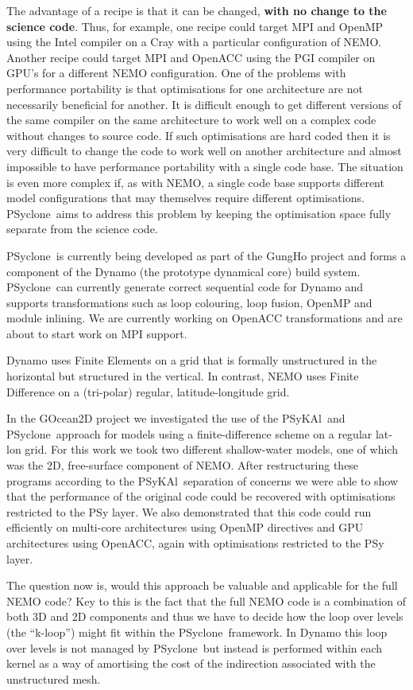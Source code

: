 \documentclass{article}
\newcommand{\psykal}{{PS}y{KA}l}
\newcommand{\psyclone}{{PS}yclone}
\begin{document}
The advantage of a recipe is that it can be changed, {\bf with no
  change to the science code}. Thus, for example, one recipe could
target MPI and OpenMP using the Intel compiler on a Cray with a
particular configuration of NEMO. Another recipe could target MPI and
OpenACC using the PGI compiler on GPU's for a different NEMO
configuration. One of the problems with performance portability is
that optimisations for one architecture are not necessarily beneficial
for another. It is difficult enough to get different versions of the
same compiler on the same architecture to work well on a complex code
without changes to source code. If such optimisations are hard coded
then it is very difficult to change the code to work well on another
architecture and almost impossible to have performance portability
with a single code base. The situation is even more complex if, as
with NEMO, a single code base supports different model configurations
that may themselves require different optimisations. \psyclone\ aims
to address this problem by keeping the optimisation space fully
separate from the science code.

\psyclone\ is currently being developed as part of the GungHo project
and forms a component of the Dynamo (the prototype dynamical core)
build system. \psyclone\ can currently generate correct sequential code
for Dynamo and supports transformations such as loop colouring, loop
fusion, OpenMP and module inlining. We are currently working
on OpenACC transformations and are about to start work on MPI support.

Dynamo uses Finite Elements on a grid that is formally
unstructured in the horizontal but structured in the vertical.  In
contrast, NEMO uses Finite Difference on a (tri-polar) regular,
latitude-longitude grid.

In the GOcean2D project we investigated the use of the \psykal\ and
\psyclone\ approach for models using a finite-difference scheme on a
regular lat-lon grid. For this work we took two different
shallow-water models, one of which was the 2D, free-surface component
of NEMO. After restructuring these programs according to the
\psykal\ separation of concerns we were able to show that the
performance of the original code could be recovered with optimisations
restricted to the PSy layer. We also demonstrated that this code could
run efficiently on multi-core architectures using OpenMP directives
and GPU architectures using OpenACC, again with optimisations
restricted to the PSy layer.

The question now is, would this approach be valuable and applicable
for the full NEMO code?  Key to this is the fact that the full NEMO
code is a combination of both 3D and 2D components and thus we have to
decide how the loop over levels (the ``k-loop'') might fit within the
\psyclone\ framework. In Dynamo this loop over levels is not managed by
\psyclone\ but instead is performed within each kernel as a way of
amortising the cost of the indirection associated with the
unstructured mesh.
\end{document}
